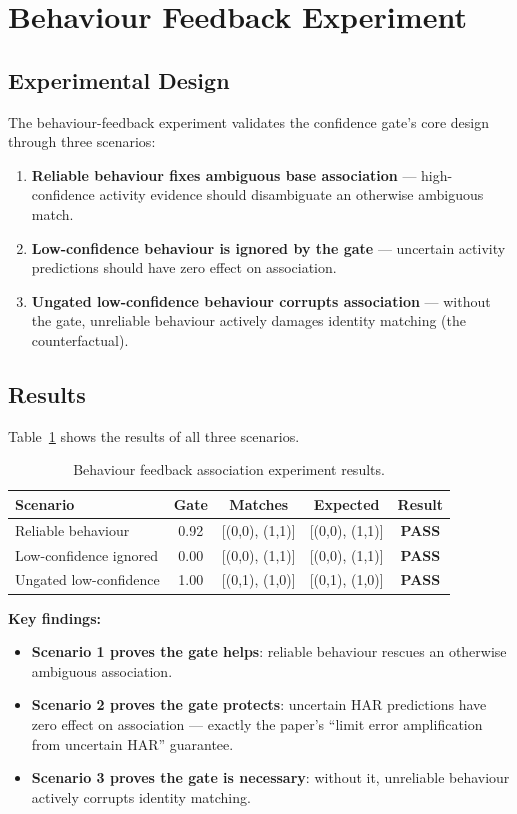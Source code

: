 \documentclass[11pt,a4paper]{article}
\begin{document}
\section{Behaviour Feedback Experiment}

\subsection{Experimental Design}
The behaviour-feedback experiment validates the confidence gate's core design through three scenarios:
\begin{enumerate}[leftmargin=2em]
    \item \textbf{Reliable behaviour fixes ambiguous base association} --- high-confidence activity evidence should disambiguate an otherwise ambiguous match.
    \item \textbf{Low-confidence behaviour is ignored by the gate} --- uncertain activity predictions should have zero effect on association.
    \item \textbf{Ungated low-confidence behaviour corrupts association} --- without the gate, unreliable behaviour actively damages identity matching (the counterfactual).
\end{enumerate}

\subsection{Results}
Table~\ref{tab:behaviour} shows the results of all three scenarios.

\begin{table}[H]
\centering
\caption{Behaviour feedback association experiment results.}
\label{tab:behaviour}
\begin{tabular}{@{}lcccc@{}}
\toprule
\textbf{Scenario} & \textbf{Gate} & \textbf{Matches} & \textbf{Expected} & \textbf{Result} \\
\midrule
Reliable behaviour & 0.92 & [(0,0), (1,1)] & [(0,0), (1,1)] & \textbf{PASS} \\
Low-confidence ignored & 0.00 & [(0,0), (1,1)] & [(0,0), (1,1)] & \textbf{PASS} \\
Ungated low-confidence & 1.00 & [(0,1), (1,0)] & [(0,1), (1,0)] & \textbf{PASS} \\
\bottomrule
\end{tabular}
\end{table}

\textbf{Key findings:}
\begin{itemize}[leftmargin=2em]
    \item \textbf{Scenario 1 proves the gate helps}: reliable behaviour rescues an otherwise ambiguous association.
    \item \textbf{Scenario 2 proves the gate protects}: uncertain HAR predictions have zero effect on association --- exactly the paper's ``limit error amplification from uncertain HAR'' guarantee.
    \item \textbf{Scenario 3 proves the gate is necessary}: without it, unreliable behaviour actively corrupts identity matching.
\end{itemize}
\end{document}
